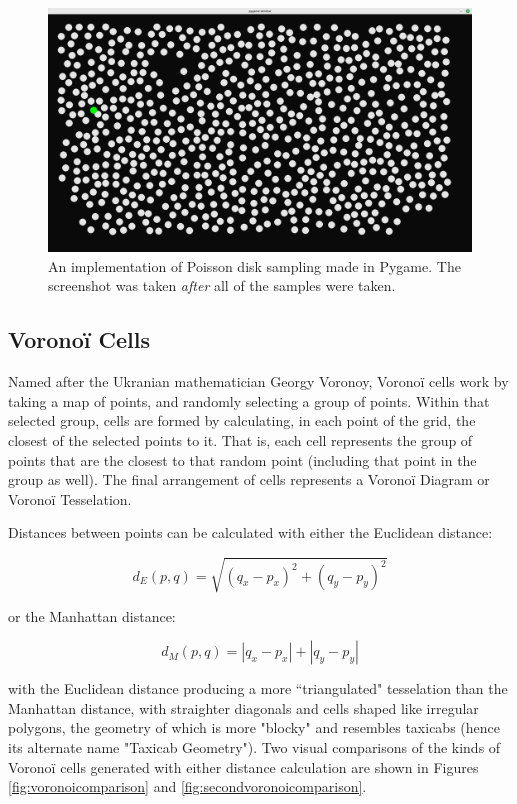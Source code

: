 \begin{figure}[H]
    \centering
    \includegraphics[width=\textwidth]{Images/pygamepoissonsample.png}
    \caption{An implementation of Poisson disk sampling made in Pygame.\cite{pygamepoissondisksampling} The screenshot was taken \textit{after} all of the samples were taken.}
    \label{fig:pygamepoisson}
\end{figure}

\subsection{Voronoï Cells}

Named after the Ukranian mathematician Georgy Voronoy, Voronoï cells work by taking a map of points, and randomly selecting a group of points. Within that selected group, cells are formed by calculating, in each point of the grid, the closest of the selected points to it. That is, each cell represents the group of points that are the closest to that random point (including that point in the group as well).\cite{pcgwikivoronoi} The final arrangement of cells represents a Voronoï Diagram or Voronoï Tesselation.

Distances between points can be calculated with either the Euclidean distance:

$$ d_{E}(p, q) = \sqrt{(q_x - p_x)^2 + (q_y - p_y)^2} $$

or the Manhattan distance:

$$ d_{M}(p, q) = |q_x - p_x| + |q_y - p_y| $$

with the Euclidean distance producing a more ``triangulated" tesselation than the Manhattan distance, with straighter diagonals and cells shaped like irregular polygons, the geometry of which is more "blocky" and resembles taxicabs (hence its alternate name "Taxicab Geometry"). Two visual comparisons of the kinds of Voronoï cells generated with either distance calculation are shown in Figures \ref{fig:voronoicomparison} and \ref{fig:secondvoronoicomparison}.


